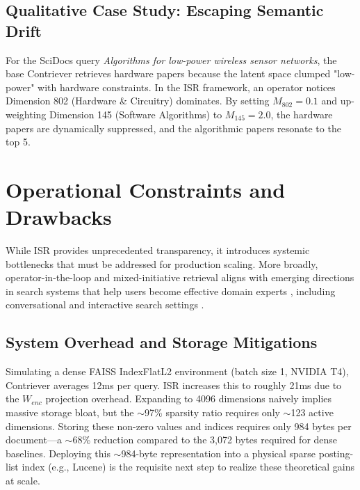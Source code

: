 \documentclass[sigconf,authordraft]{acmart}
\begin{document}
\begin{table}[htbp]
\centering
\caption{Ablation Study on ISR Components (SciDocs)}
\label{tab:ablation}
\end{table}

\subsection{Qualitative Case Study: Escaping Semantic Drift}
For the SciDocs query \textit{Algorithms for low-power wireless sensor networks}, the base Contriever retrieves hardware papers because the latent space clumped "low-power" with hardware constraints. In the ISR framework, an operator notices Dimension 802 (Hardware \& Circuitry) dominates. By setting $M_{802}=0.1$ and up-weighting Dimension 145 (Software Algorithms) to $M_{145}=2.0$, the hardware papers are dynamically suppressed, and the algorithmic papers resonate to the top 5.

\section{Operational Constraints and Drawbacks}
While ISR provides unprecedented transparency, it introduces systemic bottlenecks that must be addressed for production scaling. More broadly, operator-in-the-loop and mixed-initiative retrieval aligns with emerging directions in search systems that help users become effective domain experts \cite{metzler2021}, including conversational and interactive search settings \cite{radlinski2017}.

\subsection{System Overhead and Storage Mitigations}
Simulating a dense FAISS \cite{johnson2019} IndexFlatL2 environment (batch size 1, NVIDIA T4), Contriever averages 12ms per query. ISR increases this to roughly 21ms due to the $W_{enc}$ projection overhead. Expanding to 4096 dimensions naively implies massive storage bloat, but the $\sim$97\% sparsity ratio requires only $\sim$123 active dimensions. Storing these non-zero values and indices requires only 984 bytes per document—a $\sim$68\% reduction compared to the 3,072 bytes required for dense baselines. Deploying this $\sim$984-byte representation into a physical sparse posting-list index (e.g., Lucene) is the requisite next step to realize these theoretical gains at scale.
\end{document}
